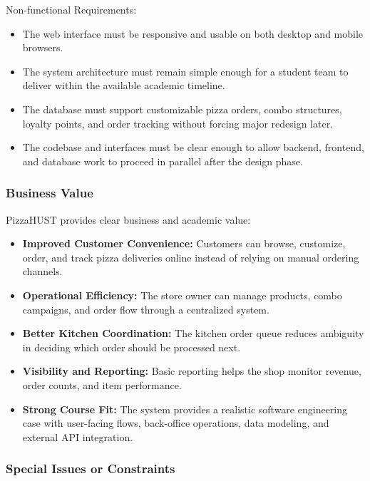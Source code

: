 Non-functional Requirements:
\begin{itemize}
    \item The web interface must be responsive and usable on both desktop and mobile browsers.
    \item The system architecture must remain simple enough for a student team to deliver within the available academic timeline.
    \item The database must support customizable pizza orders, combo structures, loyalty points, and order tracking without forcing major redesign later.
    \item The codebase and interfaces must be clear enough to allow backend, frontend, and database work to proceed in parallel after the design phase.
\end{itemize}

\subsubsection{Business Value}

PizzaHUST provides clear business and academic value:
\begin{itemize}
    \item \textbf{Improved Customer Convenience:} Customers can browse, customize, order, and track pizza deliveries online instead of relying on manual ordering channels.
    \item \textbf{Operational Efficiency:} The store owner can manage products, combo campaigns, and order flow through a centralized system.
    \item \textbf{Better Kitchen Coordination:} The kitchen order queue reduces ambiguity in deciding which order should be processed next.
    \item \textbf{Visibility and Reporting:} Basic reporting helps the shop monitor revenue, order counts, and item performance.
    \item \textbf{Strong Course Fit:} The system provides a realistic software engineering case with user-facing flows, back-office operations, data modeling, and external API integration.
\end{itemize}

\subsubsection{Special Issues or Constraints}

